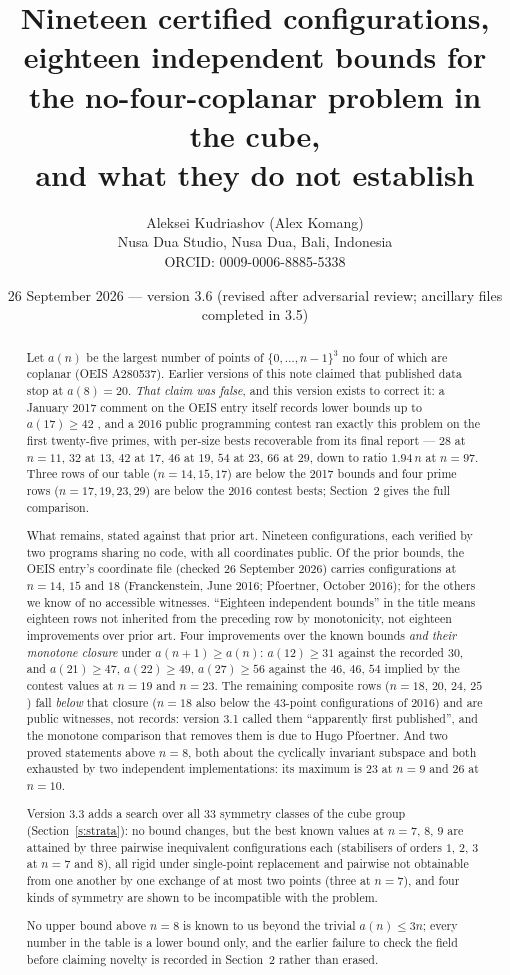 \documentclass[11pt,a4paper]{article}
\title{Nineteen certified configurations, eighteen independent bounds for the no-four-coplanar problem in the cube,\\
and what they do not establish}
\author{Aleksei Kudriashov (Alex Komang)\\ \small Nusa Dua Studio, Nusa Dua, Bali, Indonesia\\ \small ORCID: 0009-0006-8885-5338}
\date{26 September 2026 --- version 3.6 (revised after adversarial review; ancillary files completed in 3.5)}
\begin{document}
\maketitle
\begin{abstract}
Let $a(n)$ be the largest number of points of $\{0,\dots,n-1\}^3$ no four of which are coplanar
(OEIS A280537).  Earlier versions of this note claimed that published data stop at $a(8)=20$.
\emph{That claim was false}, and this version exists to correct it: a January 2017 comment on
the OEIS entry itself records lower bounds up to $a(17)\ge42$ \cite{OEISA280537}, and a 2016
public programming contest ran exactly this problem on the first twenty-five primes, with
per-size bests recoverable from its final report \cite{AZsPCs} --- $28$ at $n=11$, $32$ at $13$,
$42$ at $17$, $46$ at $19$, $54$ at $23$, $66$ at $29$, down to ratio $1.94\,n$ at $n=97$.
Three rows of our table ($n=14,15,17$) are below the 2017 bounds and four prime rows
($n=17,19,23,29$) are below the 2016 contest bests; Section~2 gives the full comparison.

What remains, stated against that prior art.  Nineteen configurations, each verified by two
programs sharing no code, with all coordinates public.  Of the prior bounds, the OEIS entry's
coordinate file (checked 26 September 2026) carries configurations at $n=14$, $15$ and $18$
(Franckenstein, June 2016; Pfoertner, October 2016); for the others we know of no accessible
witnesses.  ``Eighteen independent bounds'' in the title means eighteen rows not inherited from
the preceding row by monotonicity, not eighteen improvements over prior art.  Four improvements over the known bounds \emph{and their monotone
closure} under $a(n+1)\ge a(n)$: $a(12)\ge31$ against the recorded $30$, and $a(21)\ge47$,
$a(22)\ge49$, $a(27)\ge56$ against the $46$, $46$, $54$ implied by the contest values at $n=19$
and $n=23$.  The remaining composite rows ($n=18$, $20$, $24$, $25$) fall \emph{below} that
closure ($n=18$ also below the $43$-point configurations of 2016) and are public witnesses, not records: version 3.1 called them ``apparently first
published'', and the monotone comparison that removes them is due to Hugo Pfoertner.  And two proved
statements above $n=8$, both about the cyclically invariant subspace and both exhausted by two
independent implementations: its maximum is $23$ at $n=9$ and $26$ at $n=10$.

Version 3.3 adds a search over all 33 symmetry classes of the cube group
(Section~\ref{s:strata}): no bound changes, but the best known values at $n=7$, $8$, $9$ are
attained by three pairwise inequivalent configurations each (stabilisers of orders $1$, $2$, $3$
at $n=7$ and $8$), all rigid under single-point replacement and pairwise not obtainable from one
another by one exchange of at most two points (three at $n=7$), and four kinds of
symmetry are shown to be incompatible with the problem.

No upper bound above $n=8$ is known to us beyond the trivial $a(n)\le3n$; every number in the
table is a lower bound only, and the earlier failure to check the field before claiming novelty
is recorded in Section~2 rather than erased.
\end{abstract}
\end{document}
